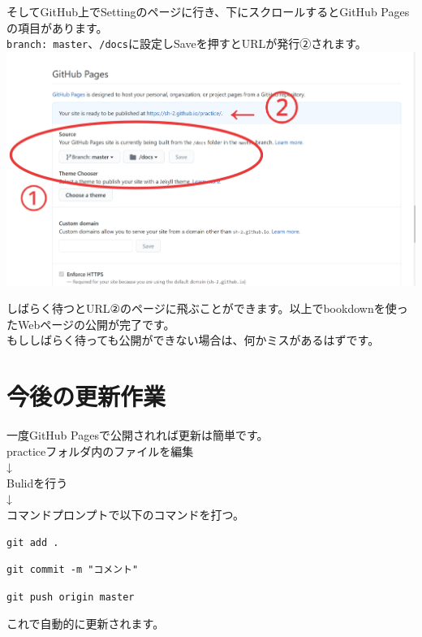 \documentclass[
]{book}
\begin{document}
そしてGitHub上でSettingのページに行き、下にスクロールするとGitHub Pagesの項目があります。\\
\texttt{branch:\ master}、\texttt{/docs}に設定しSaveを押すとURLが発行②されます。
\includegraphics{pics/Hub2.jpg}

しばらく待つとURL②のページに飛ぶことができます。以上でbookdownを使ったWebページの公開が完了です。\\
もししばらく待っても公開ができない場合は、何かミスがあるはずです。

\hypertarget{ux4ecaux5f8cux306eux66f4ux65b0ux4f5cux696d}{%
\section{今後の更新作業}\label{ux4ecaux5f8cux306eux66f4ux65b0ux4f5cux696d}}

一度GitHub Pagesで公開されれば更新は簡単です。\\

practiceフォルダ内のファイルを編集\\
↓\\
Bulidを行う\\
↓\\
コマンドプロンプトで以下のコマンドを打つ。

\begin{verbatim}
git add .
\end{verbatim}

\begin{verbatim}
git commit -m "コメント"
\end{verbatim}

\begin{verbatim}
git push origin master
\end{verbatim}

これで自動的に更新されます。
\end{document}

